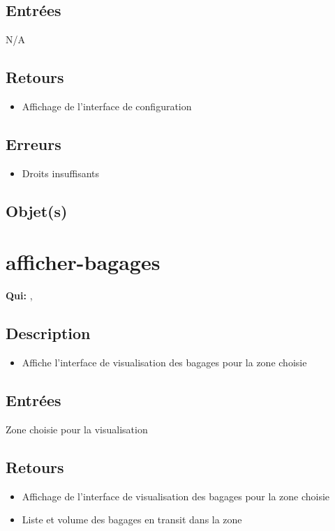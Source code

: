 	\subsection{Entrées}
		N/A

	\subsection{Retours}
	\begin{itemize}
		\item Affichage de l'interface de configuration
	\end{itemize}

	\subsection{Erreurs}
	\begin{itemize}
		\item Droits insuffisants \fatal
	\end{itemize}

	\subsection{Objet(s)}
		\allobjs

\section{afficher-bagages}
	\textbf{Qui:} \us, \urt

	\subsection{Description}
	\begin{itemize}
		\item Affiche l'interface de visualisation des bagages pour la zone choisie
	\end{itemize}

	\subsection{Entrées}
		Zone choisie pour la visualisation

	\subsection{Retours}
	\begin{itemize}
		\item Affichage de l'interface de visualisation des bagages pour la zone choisie
		\item Liste et volume des bagages en transit dans la zone
	\end{itemize}

